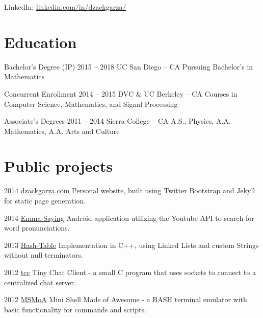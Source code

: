 \documentclass{tccv}
\begin{document}
    {LinkedIn: \href{http://www.linkedin.com/in/dzackgarza/}{linkedin.com/in/dzackgarza/}

    

\section{Education}

\begin{yearlist}

\item[Bachelor's Degree (IP)]{2015 -- 2018}
     {UC San Diego -- CA}
     {Pursuing Bachelor's in Mathematics}
     
\item[Concurrent Enrollment]{2014 -- 2015}
     {DVC \& UC Berkeley -- CA}
     {Courses in Computer Science, Mathematics, and Signal Processing}
     
\item[Associate's Degrees]{2011 -- 2014}
    {Sierra College -- CA}
    {A.S., Physics, A.A. Mathematics, A.A. Arts and Culture}

\end{yearlist}

\section{Public projects}

\begin{yearlist}


\item{2014}
     {\href{http://dzackgarza.com/}{dzackgarza.com}}
     {Personal website, built using Twitter Bootstrap and Jekyll for static page generation.}
     
\item{2014}
     {\href{https://github.com/dzackgarza/Emma-Saying-2.0}{Emma-Saying}}
     {Android application utilizing the Youtube API to search for word pronunciations.}

\item{2013}
     {\href{https://github.com/dzackgarza/Hash_Table}{Hash-Table}}
     {Implementation in C++, using Linked Lists and custom Strings without null terminators.}

\item{2012}
     {\href{https://github.com/dzackgarza/tcc/blob/master/main.c}{tcc}}
     {Tiny Chat Client - a small C program that uses sockets to connect to a centralized chat server.}

\item{2012}
     {\href{https://github.com/dzackgarza/MsMOA}{MSMoA}}
     {Mini Shell Made of Awesome - a BASH terminal emulator with basic functionality for commands and scripts.}


\end{yearlist}}
\end{document}

